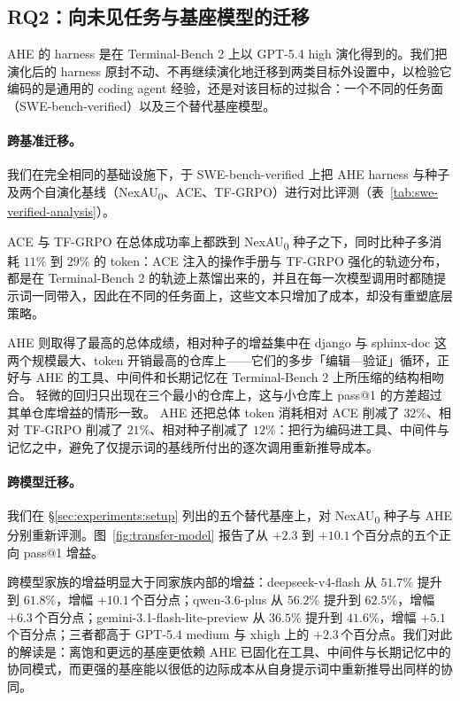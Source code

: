 \subsection{RQ2：向未见任务与基座模型的迁移}
\label{sec:experiments:transfer}

AHE 的 harness 是在 Terminal-Bench 2 上以 GPT-5.4 high 演化得到的。我们把演化后的 harness 原封不动、不再继续演化地迁移到两类目标外设置中，以检验它编码的是通用的 coding agent 经验，还是对该目标的过拟合：一个不同的任务面（SWE-bench-verified）以及三个替代基座模型。



\paragraph{跨基准迁移。}
我们在完全相同的基础设施下，于 SWE-bench-verified 上把 AHE harness 与种子及两个自演化基线（NexAU\textsubscript{0}、ACE、TF-GRPO）进行对比评测（表~\ref{tab:swe-verified-analysis}）。

ACE 与 TF-GRPO 在总体成功率上都跌到 NexAU\textsubscript{0} 种子之下，同时比种子多消耗 $11\%$ 到 $29\%$ 的 token：ACE 注入的操作手册与 TF-GRPO 强化的轨迹分布，都是在 Terminal-Bench 2 的轨迹上蒸馏出来的，并且在每一次模型调用时都随提示词一同带入，因此在不同的任务面上，这些文本只增加了成本，却没有重塑底层策略。

AHE 则取得了最高的总体成绩，相对种子的增益集中在 django 与 sphinx-doc 这两个规模最大、token 开销最高的仓库上——它们的多步「编辑—验证」循环，正好与 AHE 的工具、中间件和长期记忆在 Terminal-Bench 2 上所压缩的结构相吻合。
轻微的回归只出现在三个最小的仓库上，这与小仓库上 pass@1 的方差超过其单仓库增益的情形一致。
AHE 还把总体 token 消耗相对 ACE 削减了 $32\%$、相对 TF-GRPO 削减了 $21\%$、相对种子削减了 $12\%$：把行为编码进工具、中间件与记忆之中，避免了仅提示词的基线所付出的逐次调用重新推导成本。



\paragraph{跨模型迁移。}
我们在 \S\ref{sec:experiments:setup} 列出的五个替代基座上，对 NexAU\textsubscript{0} 种子与 AHE 分别重新评测。图~\ref{fig:transfer-model} 报告了从 $+2.3$ 到 $+10.1$\,个百分点的五个正向 pass@1 增益。

跨模型家族的增益明显大于同家族内部的增益：deepseek-v4-flash 从 $51.7\%$ 提升到 $61.8\%$，增幅 $+10.1$\,个百分点；qwen-3.6-plus 从 $56.2\%$ 提升到 $62.5\%$，增幅 $+6.3$\,个百分点；gemini-3.1-flash-lite-preview 从 $36.5\%$ 提升到 $41.6\%$，增幅 $+5.1$\,个百分点；三者都高于 GPT-5.4 medium 与 xhigh 上的 $+2.3$\,个百分点。我们对此的解读是：离饱和更远的基座更依赖 AHE 已固化在工具、中间件与长期记忆中的协同模式，而更强的基座能以很低的边际成本从自身提示词中重新推导出同样的协同。

